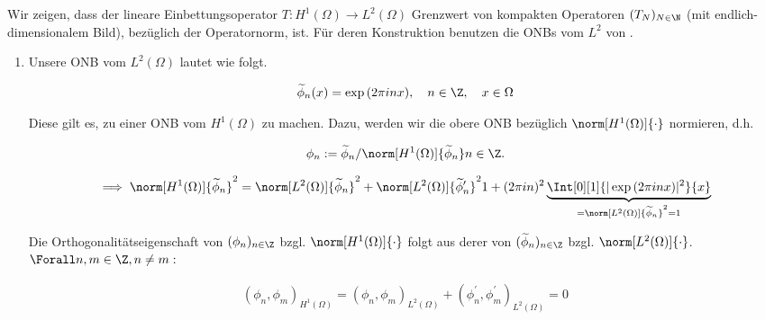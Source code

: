 \begin{solution}

\phantom{}



Wir zeigen, dass der lineare Einbettungsoperator $T: H^1(\Omega) \to L^2(\Omega)$ Grenzwert von kompakten Operatoren $(T_N)_{N \in \N}$ (mit endlich-dimensionalem Bild), bezüglich der Operatornorm, ist.
Für deren Konstruktion benutzen die ONBs vom $L^2$ von \cite[Satz 2.6.6]{Ana3}.

\begin{enumerate}[label = \textbf{\alph*)}]

  \item Unsere ONB vom $L^2(\Omega)$ lautet wie folgt.
  
  \begin{align*}
    \widetilde{\phi}_n(x) = \exp{(2 \pi i n x)},
    \quad
    n \in \Z,
    \quad
    x \in \Omega
  \end{align*}

  Diese gilt es, zu einer ONB vom $H^1(\Omega)$ zu machen.
  Dazu, werden wir die obere ONB bezüglich $\norm[H^1(\Omega)]{\cdot}$ normieren, d.h.

  \begin{align*}
    \phi_n
    :=
    \widetilde{\phi}_n
    /
    \norm[H^1(\Omega)]{\widetilde{\phi}_n}
    n \in \Z.
  \end{align*}

  \begin{align*}
    \implies
    \norm[H^1(\Omega)]{\widetilde{\phi}_n}^2
    =
    \norm[L^2(\Omega)]{\widetilde{\phi}_n}^2
    +
    \norm[L^2(\Omega)]{\widetilde{\phi}_n^\prime}^2
    1
    +
    (2 \pi i n)^2
    \underbrace
    {
      \Int[0][1]{|\exp{(2 \pi i n x)}|^2}{x}
    }_{
      =
      \norm[L^2(\Omega)]{\widetilde{\phi}_n}^2
      =
      1
    }
  \end{align*}

  Die Orthogonalitätseigenschaft von $(\phi_n)_{n \in \Z}$ bzgl. $\norm[H^1(\Omega)]{\cdot}$ folgt aus derer von $(\widetilde{\phi}_n)_{n \in \Z}$ bzgl. $\norm[L^2(\Omega)]{\cdot}$.
  $\Forall n, m \in \Z, n \neq m:$

  \begin{align*}
    (\phi_n, \phi_m)_{H^1(\Omega)}
    =
    (\phi_n, \phi_m)_{L^2(\Omega)}
    +
    (\phi_n^\prime, \phi_m^\prime)_{L^2(\Omega)}
    =
    0
  \end{align*}


\end{enumerate}
\end{solution}
